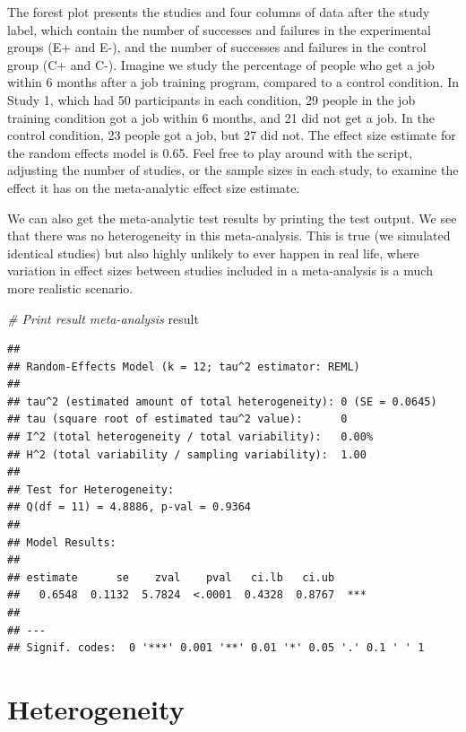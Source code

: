 \documentclass[
  oneside]{book}
\newenvironment{Shaded}{\begin{snugshade}}{\end{snugshade}}
\newcommand{\CommentTok}[1]{\textcolor[rgb]{0.56,0.35,0.01}{\textit{#1}}}
\newcommand{\NormalTok}[1]{#1}
\begin{document}
The forest plot presents the studies and four columns of data after the study label, which contain the number of successes and failures in the experimental groups (E+ and E-), and the number of successes and failures in the control group (C+ and C-). Imagine we study the percentage of people who get a job within 6 months after a job training program, compared to a control condition. In Study 1, which had 50 participants in each condition, 29 people in the job training condition got a job within 6 months, and 21 did not get a job. In the control condition, 23 people got a job, but 27 did not. The effect size estimate for the random effects model is 0.65. Feel free to play around with the script, adjusting the number of studies, or the sample sizes in each study, to examine the effect it has on the meta-analytic effect size estimate.

We can also get the meta-analytic test results by printing the test output. We see that there was no heterogeneity in this meta-analysis. This is true (we simulated identical studies) but also highly unlikely to ever happen in real life, where variation in effect sizes between studies included in a meta-analysis is a much more realistic scenario.

\begin{Shaded}
\begin{Highlighting}[]
\CommentTok{\# Print result meta{-}analysis}
\NormalTok{result}
\end{Highlighting}
\end{Shaded}

\begin{verbatim}
## 
## Random-Effects Model (k = 12; tau^2 estimator: REML)
## 
## tau^2 (estimated amount of total heterogeneity): 0 (SE = 0.0645)
## tau (square root of estimated tau^2 value):      0
## I^2 (total heterogeneity / total variability):   0.00%
## H^2 (total variability / sampling variability):  1.00
## 
## Test for Heterogeneity:
## Q(df = 11) = 4.8886, p-val = 0.9364
## 
## Model Results:
## 
## estimate      se    zval    pval   ci.lb   ci.ub 
##   0.6548  0.1132  5.7824  <.0001  0.4328  0.8767  *** 
## 
## ---
## Signif. codes:  0 '***' 0.001 '**' 0.01 '*' 0.05 '.' 0.1 ' ' 1
\end{verbatim}

\hypertarget{heterogeneity}{%
\section{Heterogeneity}\label{heterogeneity}}
\end{document}

